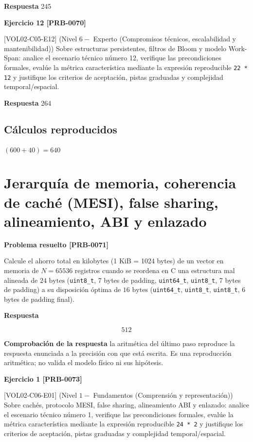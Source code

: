\documentclass{book}
\begin{document}
\noindent\textbf{Respuesta} 245

\noindent\textbf{Ejercicio 12 [PRB-0070]}

[VOL02-C05-E12] (Nivel \(6 -\) Experto (Compromisos técnicos, escalabilidad y mantenibilidad)) Sobre estructuras persistentes, filtros de Bloom y modelo Work-Span: analice el escenario técnico número 12, verifique las precondiciones formales, evalúe la métrica característica mediante la expresión reproducible \texttt{22 * 12} y justifique los criterios de aceptación, pistas graduadas y complejidad temporal/espacial.

\noindent\textbf{Respuesta} 264

\subsection*{Cálculos reproducidos}

\(\left(600+40\right) = 640\)

\section{Jerarquía de memoria, coherencia de caché (MESI), false sharing, alineamiento, ABI y enlazado}

\noindent\textbf{Problema resuelto [PRB-0071]}

Calcule el ahorro total en kilobytes (1 KiB = 1024 bytes) de un vector en memoria de \(N = 65536\) registros cuando se reordena en C una estructura mal alineada de \(24\text{ bytes}\) (\texttt{uint8\_t}, 7 bytes de padding, \texttt{uint64\_t}, \texttt{uint8\_t}, 7 bytes de padding) a su disposición óptima de \(16\text{ bytes}\) (\texttt{uint64\_t}, \texttt{uint8\_t}, \texttt{uint8\_t}, 6 bytes de padding final).

\noindent\textbf{Respuesta}

\[
512
\]

\noindent\textbf{Comprobación de la respuesta} la aritmética del último paso reproduce la respuesta enunciada a la precisión con que está escrita. Es una reproducción aritmética; no valida el modelo físico ni sus hipótesis.

\noindent\textbf{Ejercicio 1 [PRB-0073]}

[VOL02-C06-E01] (Nivel \(1 -\) Fundamentos (Comprensión y representación)) Sobre cachés, protocolo MESI, false sharing, alineamiento ABI y enlazado: analice el escenario técnico número 1, verifique las precondiciones formales, evalúe la métrica característica mediante la expresión reproducible \texttt{24 * 2} y justifique los criterios de aceptación, pistas graduadas y complejidad temporal/espacial.
\end{document}
